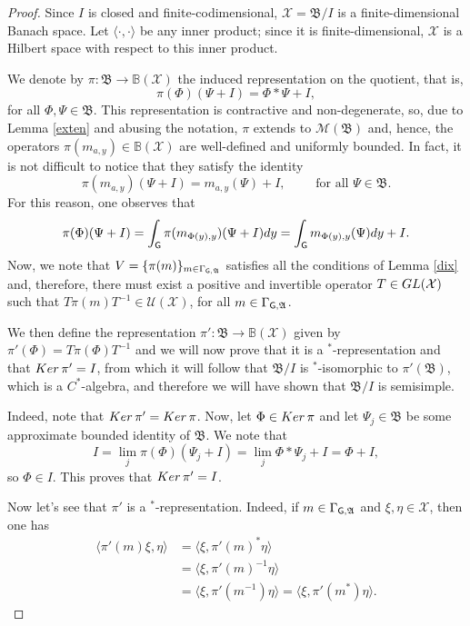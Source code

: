 \documentclass[11pt]{article}
\newcommand{\A}{\mathfrak{A}}
\newcommand{\B}{\mathfrak{B}}
\def\X{\mathcal{X}}
\def\d{{\rm d}}
\def\G{{\sf G}}
\theoremstyle{definition}
\theoremstyle{remark}
\numberwithin{equation}{section}
\numberwithin{equation}{section}
\begin{document}
\begin{proof}
Since $I$ is closed and finite-codimensional, $\mathcal X=\B/I$ is a finite-dimensional Banach space. Let $\langle\cdot,\cdot\rangle$ be any inner product; since it is finite-dimensional, $\X$ is a Hilbert space with respect to this inner product.

We denote by $\pi:\B\to\mathbb B(\mathcal X)$ the induced representation on the quotient, that is, 
$$
\pi(\Phi)(\Psi+I)=\Phi*\Psi+I,
$$
for all $\Phi,\Psi\in \B$. This representation is contractive and non-degenerate, so, due to Lemma \ref{exten} and abusing the notation, $\pi$ extends to $\mathcal M(\B)$ and, hence, the operators $\pi(m_{a,y})\in\mathbb B(\X)$ are well-defined and uniformly bounded. In fact, it is not difficult to notice that they satisfy the identity
$$
\pi(m_{a,y})(\Psi+I)=m_{a,y}(\Psi)+I,\quad\quad\text{ for all }\Psi\in\B.
$$
For this reason, one observes that
\begin{equation}\label{desinte}
\pi(\Phi)(\Psi+I)=\int_\G \pi(m_{\Phi(y),y})(\Psi+I)\d y=\int_\G m_{\Phi(y),y}(\Psi)\d y +I.
\end{equation}
Now, we note that $V=\{\pi(m)\}_{m\in\Gamma_{\G,\A}}$ satisfies all the conditions of Lemma \ref{dix} and, therefore, there must exist a positive and invertible operator $T\in {\rm GL}(\X)$ such that $T\pi(m)T^{-1}\in \mathcal U(\X)$, for all ${m\in\Gamma_{\G,\A}}$.

We then define the representation $\pi':\B\to\mathbb B(\X)$ given by $\pi'(\Phi)=T\pi(\Phi)T^{-1}$ and we will now prove that it is a $^*$-representation and that ${\rm Ker}\,\pi'=I$, from which it will follow that $\B/I$ is $^*$-isomorphic to $\pi'(\B)$, which is a $C^*$-algebra, and therefore we will have shown that $\B/I$ is semisimple.

Indeed, note that ${\rm Ker}\,\pi'={\rm Ker}\,\pi$. Now, let $\Phi\in{\rm Ker}\,\pi$ and let $\Psi_j\in\B$ be some approximate bounded identity of $\B$. We note that
$$
I=\lim_j\pi(\Phi)(\Psi_j+I)=\lim_j \Phi*\Psi_j+I=\Phi+I,
$$ 
so $\Phi\in I$. This proves that ${\rm Ker}\,\pi'=I$.

Now let's see that $\pi'$ is a $^*$-representation. Indeed, if $m\in\Gamma_{\G,\A}$ and $\xi,\eta\in\X$, then one has 
\begin{align*}
    \langle \pi'(m)\xi,\eta\rangle&=\langle \xi,\pi'(m)^{*}\eta\rangle \\
    &=\langle \xi,\pi'(m)^{-1}\eta\rangle \\
    &=\langle \xi,\pi'(m^{-1})\eta\rangle=\langle \xi,\pi'(m^*)\eta\rangle.
\end{align*}


\end{proof}
\end{document}
